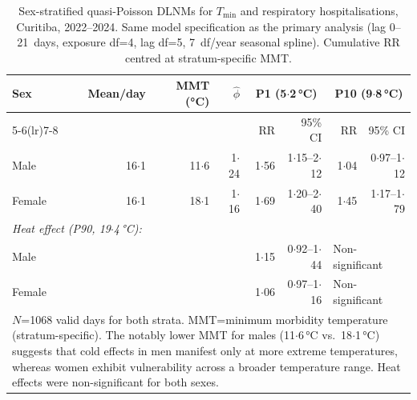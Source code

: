 \documentclass[12pt]{article}
\begin{document}
\begin{table}[ht]
\centering
\caption{Sex-stratified quasi-Poisson DLNMs for $T_\mathrm{min}$ and
respiratory hospitalisations, Curitiba, 2022--2024. Same model
specification as the primary analysis (lag 0--21~days, exposure df=4,
lag df=5, 7~df/year seasonal spline). Cumulative RR centred at
stratum-specific MMT.}
\label{etab:sex_dlnm}
\begin{tabular}{lrrrrrrr}
\toprule
Sex & Mean/day & MMT (°C) & $\hat{\phi}$ &
  \multicolumn{2}{c}{P1 (5${\cdot}$2\,°C)} &
  \multicolumn{2}{c}{P10 (9${\cdot}$8\,°C)} \\
\cmidrule(lr){5-6}\cmidrule(lr){7-8}
& & & & RR & 95\% CI & RR & 95\% CI \\
\midrule
Male   & 16${\cdot}$1 & 11${\cdot}$6 & 1${\cdot}$24
  & 1${\cdot}$56 & 1${\cdot}$15--2${\cdot}$12
  & 1${\cdot}$04 & 0${\cdot}$97--1${\cdot}$12 \\
Female & 16${\cdot}$1 & 18${\cdot}$1 & 1${\cdot}$16
  & 1${\cdot}$69 & 1${\cdot}$20--2${\cdot}$40
  & 1${\cdot}$45 & 1${\cdot}$17--1${\cdot}$79 \\
\midrule
\multicolumn{8}{l}{\footnotesize \textit{Heat effect (P90, 19${\cdot}$4\,°C):}} \\
Male   & & & & 1${\cdot}$15 & 0${\cdot}$92--1${\cdot}$44
  & \multicolumn{2}{l}{Non-significant} \\
Female & & & & 1${\cdot}$06 & 0${\cdot}$97--1${\cdot}$16
  & \multicolumn{2}{l}{Non-significant} \\
\bottomrule
\multicolumn{8}{p{0.95\textwidth}}{\footnotesize
$N$=1068 valid days for both strata. MMT=minimum morbidity temperature
(stratum-specific). The notably lower MMT for males (11${\cdot}$6\,°C
vs.\ 18${\cdot}$1\,°C) suggests that cold effects in men manifest only
at more extreme temperatures, whereas women exhibit vulnerability
across a broader temperature range. Heat effects were non-significant
for both sexes.}
\end{tabular}
\end{table}
\end{document}
